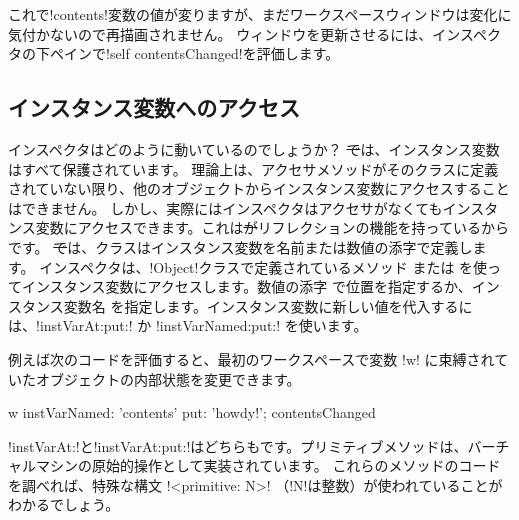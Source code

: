 \documentclass[a4paper,10pt,twoside]{book}
\begin{document}
これで\ct!contents!変数の値が変りますが、まだワークスペースウィンドウは変化に気付かないので再描画されません。
ウィンドウを更新させるには、インスペクタの下ペインで\ct!self contentsChanged!を評価します。

\subsection{インスタンス変数へのアクセス}

インスペクタはどのように動いているのでしょうか？
\st では、インスタンス変数はすべて保護されています。
理論上は、アクセサメソッドがそのクラスに定義されていない限り、他のオブジェクトからインスタンス変数にアクセスすることはできません。
しかし、実際にはインスペクタはアクセサがなくてもインスタンス変数にアクセスできます。これは\st がリフレクションの機能を持っているからです。
\st では、クラスはインスタンス変数を名前または数値の添字で定義します。
インスペクタは、\ct!Object!クラスで定義されているメソッド  または  を使ってインスタンス変数にアクセスします。数値の添字  で位置を指定するか、インスタンス変数名  を指定します。インスタンス変数に新しい値を代入するには、\ct!instVarAt:put:! か \ct!instVarNamed:put:! を使います。

例えば次のコードを評価すると、最初のワークスペースで変数 \ct!w! に束縛されていたオブジェクトの内部状態を変更できます。

\begin{code}{}
w instVarNamed: 'contents' put: 'howdy!'; contentsChanged
\end{code}


\ct!instVarAt:!と\ct!instVarAt:put:!はどちらもです。プリミティブメソッドは、バーチャルマシンの原始的操作として実装されています。
これらのメソッドのコードを調べれば、特殊な構文 \ct!<primitive: N>! （\ct!N!は整数）が使われていることがわかるでしょう。
\end{document}

